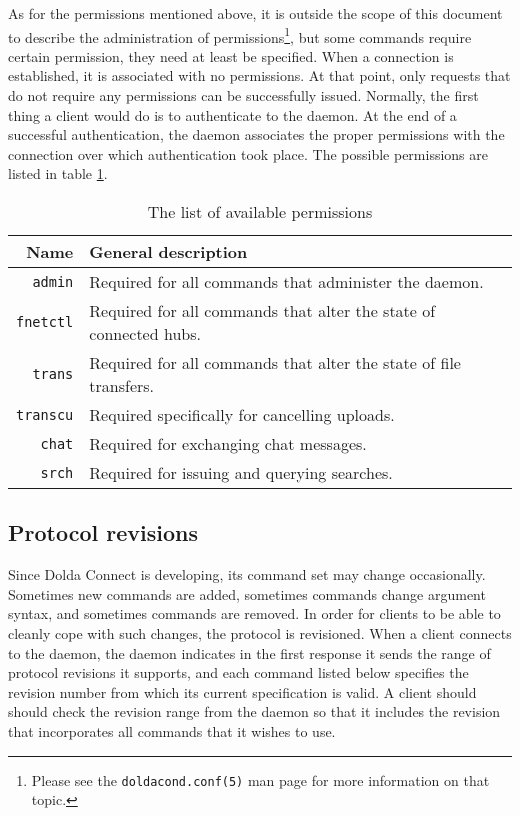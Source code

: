 \documentclass[twoside,a4paper,11pt]{article}
\begin{document}
As for the permissions mentioned above, it is outside the scope of
this document to describe the administration of
permissions\footnote{Please see the \texttt{doldacond.conf(5)} man
  page for more information on that topic.}, but some commands require
certain permission, they need at least be specified. When a connection
is established, it is associated with no permissions. At that point,
only requests that do not require any permissions can be successfully
issued. Normally, the first thing a client would do is to authenticate
to the daemon. At the end of a successful authentication, the daemon
associates the proper permissions with the connection over which
authentication took place. The possible permissions are listed in
table \ref{tab:perm}.

\begin{table}
  \begin{tabular}{rl}
    Name & General description \\
    \hline
    \texttt{admin} & Required for all commands that administer the
    daemon. \\
    \texttt{fnetctl} & Required for all commands that alter the state of
    connected hubs. \\
    \texttt{trans} & Required for all commands that alter the state of
    file transfers. \\
    \texttt{transcu} & Required specifically for cancelling uploads. \\
    \texttt{chat} & Required for exchanging chat messages. \\
    \texttt{srch} & Required for issuing and querying searches. \\
  \end{tabular}
  \caption{The list of available permissions}
  \label{tab:perm}
\end{table}

\subsection{Protocol revisions}
\label{rev}
Since Dolda Connect is developing, its command set may change
occasionally. Sometimes new commands are added, sometimes commands
change argument syntax, and sometimes commands are removed. In order
for clients to be able to cleanly cope with such changes, the protocol
is revisioned. When a client connects to the daemon, the daemon
indicates in the first response it sends the range of protocol
revisions it supports, and each command listed below specifies the
revision number from which its current specification is valid. A
client should should check the revision range from the daemon so that
it includes the revision that incorporates all commands that it wishes
to use.
\end{document}
